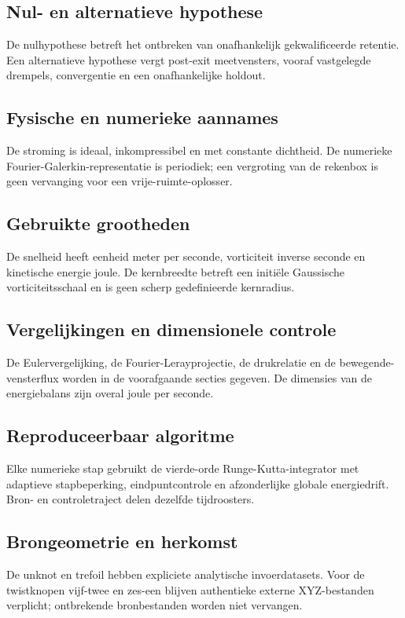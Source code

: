 \documentclass[10pt,a4paper]{article}
\begin{document}
\subsection{Nul- en alternatieve hypothese}
De nulhypothese betreft het ontbreken van onafhankelijk gekwalificeerde retentie. Een alternatieve hypothese vergt post-exit meetvensters, vooraf vastgelegde drempels, convergentie en een onafhankelijke holdout.
\subsection{Fysische en numerieke aannames}
De stroming is ideaal, inkompressibel en met constante dichtheid. De numerieke Fourier-Galerkin-representatie is periodiek; een vergroting van de rekenbox is geen vervanging voor een vrije-ruimte-oplosser.
\subsection{Gebruikte grootheden}
De snelheid heeft eenheid meter per seconde, vorticiteit inverse seconde en kinetische energie joule. De kernbreedte betreft een initiële Gaussische vorticiteitsschaal en is geen scherp gedefinieerde kernradius.
\subsection{Vergelijkingen en dimensionele controle}
De Eulervergelijking, de Fourier-Lerayprojectie, de drukrelatie en de bewegende-vensterflux worden in de voorafgaande secties gegeven. De dimensies van de energiebalans zijn overal joule per seconde.
\subsection{Reproduceerbaar algoritme}
Elke numerieke stap gebruikt de vierde-orde Runge-Kutta-integrator met adaptieve stapbeperking, eindpuntcontrole en afzonderlijke globale energiedrift. Bron- en controletraject delen dezelfde tijdroosters.
\subsection{Brongeometrie en herkomst}
De unknot en trefoil hebben expliciete analytische invoerdatasets. Voor de twistknopen vijf-twee en zes-een blijven authentieke externe XYZ-bestanden verplicht; ontbrekende bronbestanden worden niet vervangen.
\end{document}
